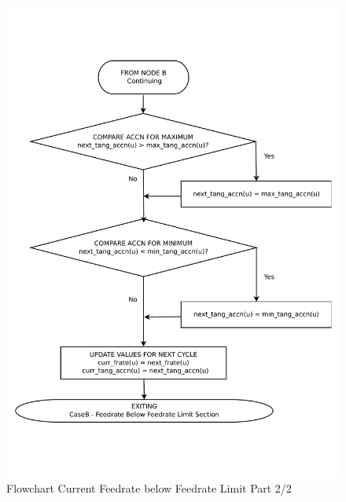 \begin{figure}
	\caption{Flowchart Current Feedrate below Feedrate Limit Part 2/2}
	\label{02-CaseB2-Feedrate-Below-Limit-Main-Region-flowchart.pdf}
	\centering
	\includegraphics[width=1.10\textwidth,]{Images/Chap3/02-CaseB2-Feedrate-Below-Limit-Main-Region-flowchart.pdf} 
\end{figure}


\clearpage
\pagebreak



